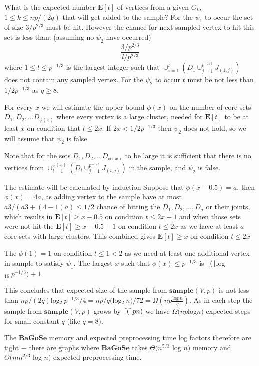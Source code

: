 \documentclass[shortabstract, lic, english]{iithesis}
\theoremstyle{definition} \newtheorem{definition}{Definition}[chapter]
\theoremstyle{plain} \newtheorem{remark}[definition]{Observation}
\theoremstyle{plain} \newtheorem{theorem}[definition]{Theorem}
\theoremstyle{plain} \newtheorem{lemma}[definition]{Lemma}
\theoremstyle{plain} \newtheorem{conjecture}[definition]{Conjecture}
\DeclarePairedDelimiter{\ceil}{\lceil}{\rceil}
\DeclarePairedDelimiter{\floor}{\lfloor}{\rfloor}
\begin{document}
What is the expected number $\mathbf{E}[t]$ of vertices from a given $G_k$, $1 \leq k \leq np/(2q)$ that will get added to the sample?
For the $\psi_1$ to occur the set of size $3/p^{2/3}$ must be hit. However the chance for next sampled vertex to hit this set is less than: (assuming no $\psi_2$ have occurred)
$$\frac{3/p^{2/3}}{l/p^{2/3}}$$
where $1 \leq l \leq p^{-1/3}$ is the largest integer such that $\cup_{i=1}^{l} (D_1 \cup_{j=1}^{p^{-1/3}} J_{(1, j)})$ does not contain any sampled vertex.
For the $\psi_2$ to occur $t$ must be not less than $1/2  p^{-1/3}$ as $q \geq 8$.

For every $x$ we will estimate the upper bound $\phi(x)$ on the number of core sets $D_1, D_2, \ldots D_{\phi(x)}$ where every vertex is a large cluster, needed for $\mathbf{E}[t]$ to be at least $x$ on condition that $t \leq 2x$.
If $2x < 1/2  p^{-1/3}$ then $\psi_2$ does not hold, so we will assume that $\psi_2$ is false.

Note that for the sets $D_1, D_2, \ldots D_{\phi(x)}$ to be large it is sufficient that there is no vertices from $\cup_{i=1}^{\phi(x)}(D_i \cup_{j=1}^{p^{-1/3}} J_{(i, j)})$ in the sample, and $\psi_2$ is false.

The estimate will be calculated by induction
Suppose that $\phi(x - 0.5) = a$, then $\phi(x) = 4a$, as adding vertex to the sample have at most $a  3 / (a  3 + (4-1)a) \leq 1/2$ chance of hitting the $D_1, D_2, \ldots, D_a$ or their joints, which results in $\mathbf{E}[t] \geq x - 0.5$ on condition $t \leq 2x - 1$ and
when those sets were not hit the $\mathbf{E}[t] \geq x - 0.5 + 1$ on condition $t \leq 2x$ as we have at least $a$ core sets with large clusters. This combined gives $\mathbf{E}[t] \geq x$ on condition $t \leq 2x$

The $\phi(1) = 1$ on condition $t \leq 1 < 2$ as we need at least one additional vertex in sample to satisfy $\psi_1$.
The largest $x$ such that $\phi(x) \leq p^{-1/3}$ is $\floor($log$_{16}~p^{-1/3}) + 1$.

This concludes that expected size of the sample from $\mathbf{sample}(V, p)$ is not less than
$np/(2q)  $log$_2~p^{-1/3}/4 = np/q  ($log$_2~ n)/72 = \Omega(np  \frac{\text{log}~n}{q})$.
As in each step the sample from $\mathbf{sample}(V, p)$ grows by $\ceil(pn)$ we have $\Omega(np $log$ n)$ expected steps for small constant $q$ (like $q = 8$).

The $\mathbf{BaGoSe}$ memory and expected preprocessing time log factors therefore are tight $-$ there are graphs where $\mathbf{BaGoSe}$ takes $\Theta(n^{5/3} $ log $n)$ memory and $\Theta(mn^{2/3} $ log $n)$ expected preprocessing time.
\end{document}
